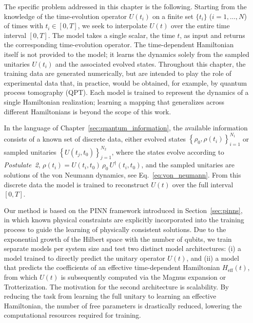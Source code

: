 The specific problem addressed in this chapter is the following. Starting from the knowledge of the time-evolution operator $U(t_i)$ on a finite set $\{t_i\}$ ($i=1,\dots,N$) of times with $t_i\in[0,T]$, we seek to interpolate $U(t)$ over the entire time interval $[0,T]$. The model takes a single scalar, the time $t$, as input and returns the corresponding time-evolution operator. The time-dependent Hamiltonian itself is not provided to the model; it learns the dynamics solely from the sampled unitaries $U(t_i)$ and the associated evolved states. Throughout this chapter, the training data are generated numerically, but are intended to play the role of experimental data that, in practice, would be obtained, for example, by quantum process tomography (QPT). Each model is trained to represent the dynamics of a single Hamiltonian realization; learning a mapping that generalizes across different Hamiltonians is beyond the scope of this work.

In the language of Chapter~\ref{sec:quantum_information}, the available information consists of a known set of discrete data, either evolved states $\left\{ \rho_0, \rho(t_i) \right\}_{i=1}^{N_1}$ or sampled unitaries $\left\{ U(t_j,t_0) \right\}_{j=1}^{N_2}$, where the states evolve according to \textit{Postulate~2}, $\rho(t_i) = U(t_i,t_0)\,\rho_0\,U^{\dagger}(t_i,t_0)$, and the sampled unitaries are solutions of the von Neumann dynamics, see Eq.~\eqref{eq:von_neumann}. From this discrete data the model is trained to reconstruct $U(t)$ over the full interval $[0,T]$.

Our method is based on the PINN framework introduced in Section~\ref{sec:pinns}, in which known physical constraints are explicitly incorporated into the training process to guide the learning of physically consistent solutions. Due to the exponential growth of the Hilbert space with the number of qubits, we train separate models per system size and test two distinct model architectures: (i) a model trained to directly predict the unitary operator $U(t)$, and (ii) a model that predicts the coefficients of an effective time-dependent Hamiltonian $H_\mathrm{eff}(t)$, from which $U(t)$ is subsequently computed via the Magnus expansion or Trotterization. The motivation for the second architecture is scalability. By reducing the task from learning the full unitary to learning an effective Hamiltonian, the number of free parameters is drastically reduced, lowering the computational resources required for training.


